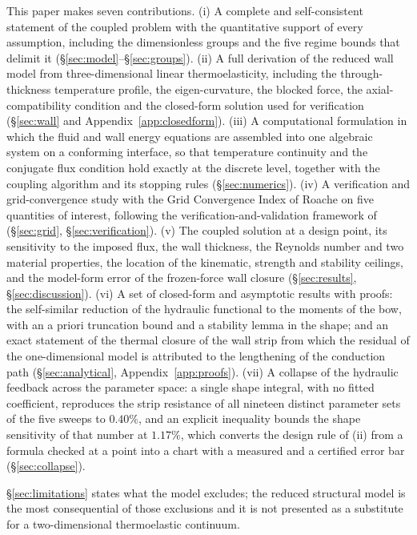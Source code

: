 \documentclass[11pt,a4paper]{article}
\begin{document}
This paper makes seven contributions.
(i) A complete and self-consistent statement of the coupled problem with the
quantitative support of every assumption, including the dimensionless groups
and the five regime bounds that delimit it (\S\ref{sec:model}--\S\ref{sec:groups}).
(ii) A full derivation of the reduced wall model from three-dimensional
linear thermoelasticity, including the through-thickness temperature profile,
the eigen-curvature, the blocked force, the axial-compatibility condition and
the closed-form solution used for verification (\S\ref{sec:wall} and
Appendix~\ref{app:closedform}).
(iii) A computational formulation in which the fluid and wall energy
equations are assembled into one algebraic system on a conforming interface,
so that temperature continuity and the conjugate flux condition hold exactly
at the discrete level, together with the coupling algorithm and its stopping
rules (\S\ref{sec:numerics}).
(iv) A verification and grid-convergence study with the Grid Convergence
Index of Roache \citep{roache1994perspective} on five quantities of interest,
following the verification-and-validation framework of
\citet{oberkampf2002verification} (\S\ref{sec:grid}, \S\ref{sec:verification}).
(v) The coupled solution at a design point, its sensitivity to the imposed
flux, the wall thickness, the Reynolds number and two material properties,
the location of the kinematic, strength and stability ceilings, and the
model-form error of the frozen-force wall closure (\S\ref{sec:results},
\S\ref{sec:discussion}).
(vi) A set of closed-form and asymptotic results with proofs: the self-similar reduction of the
hydraulic functional to the moments of the bow, with an a priori truncation bound and a
stability lemma in the shape; and an exact statement of the thermal closure of the wall strip
from which the residual of the one-dimensional model is attributed to the lengthening of the
conduction path (\S\ref{sec:analytical}, Appendix~\ref{app:proofs}).
(vii) A collapse of the hydraulic feedback across the parameter space: a single shape integral,
with no fitted coefficient, reproduces the strip resistance of all nineteen distinct parameter
sets of the five sweeps to $0.40\%$, and an explicit inequality bounds the shape
sensitivity of that number at $1.17\%$, which converts the design rule of (ii) from a formula
checked at a point into a chart with a measured and a certified error bar
(\S\ref{sec:collapse}).

\S\ref{sec:limitations} states what the model excludes; the reduced
structural model is the most consequential of those exclusions and it is not
presented as a substitute for a two-dimensional thermoelastic continuum.
\end{document}
